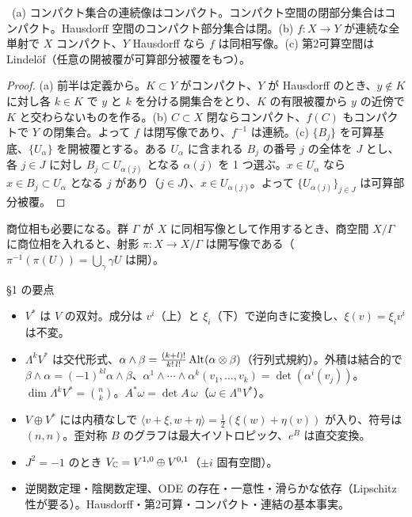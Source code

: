 \begin{prop}\label{A:prop:top}
\tP\ (a) コンパクト集合の連続像はコンパクト。コンパクト空間の閉部分集合はコンパクト。Hausdorff 空間のコンパクト部分集合は閉。(b) $f:X\to Y$ が連続な全単射で $X$ コンパクト、$Y$ Hausdorff なら $f$ は同相写像。(c) 第2可算空間は Lindelöf（任意の開被覆が可算部分被覆をもつ）。
\end{prop}
\begin{proof}
(a) 前半は定義から。$K\subset Y$ がコンパクト、$Y$ が Hausdorff のとき、$y\notin K$ に対し各 $k\in K$ で $y$ と $k$ を分ける開集合をとり、$K$ の有限被覆から $y$ の近傍で $K$ と交わらないものを作る。(b) $C\subset X$ 閉ならコンパクト、$f(C)$ もコンパクトで $Y$ の閉集合。よって $f$ は閉写像であり、$f^{-1}$ は連続。(c) $\{B_j\}$ を可算基底、$\{U_\alpha\}$ を開被覆とする。ある $U_\alpha$ に含まれる $B_j$ の番号 $j$ の全体を $J$ とし、各 $j\in J$ に対し $B_j\subset U_{\alpha(j)}$ となる $\alpha(j)$ を 1 つ選ぶ。$x\in U_\alpha$ なら $x\in B_j\subset U_\alpha$ となる $j$ があり（$j\in J$）、$x\in U_{\alpha(j)}$。よって $\{U_{\alpha(j)}\}_{j\in J}$ は可算部分被覆。
\end{proof}

商位相も必要になる。群 $\Gamma$ が $X$ に同相写像として作用するとき、商空間 $X/\Gamma$ に商位相を入れると、射影 $\pi:X\to X/\Gamma$ は開写像である（$\pi^{-1}(\pi(U))=\bigcup_{\gamma}\gamma U$ は開）。

\begin{keybox}{§1 の要点}
\begin{itemize}
\item $V^*$ は $V$ の双対。成分は $v^i$（上）と $\xi_i$（下）で逆向きに変換し、$\xi(v)=\xi_iv^i$ は不変。
\item $\Lambda^kV^*$ は交代形式、$\alpha\wedge\beta=\frac{(k+l)!}{k!\,l!}\operatorname{Alt}(\alpha\otimes\beta)$（行列式規約）。外積は結合的で \mbox{$\beta\wedge\alpha=(-1)^{kl}\alpha\wedge\beta$}、\allowbreak\mbox{$\alpha^1\wedge\cdots\wedge\alpha^k(v_1,\dots,v_k)=\det(\alpha^i(v_j))$}。\allowbreak\mbox{$\dim\Lambda^kV^*=\binom nk$}。\allowbreak\mbox{$A^*\omega=\det A\,\omega$}（$\omega\in\Lambda^nV^*$）。
\item $V\oplus V^*$ には内積なしで $\langle v+\xi,w+\eta\rangle=\frac12(\xi(w)+\eta(v))$ が入り、符号は $(n,n)$。歪対称 $B$ のグラフは最大イソトロピック、$e^B$ は直交変換。
\item $J^2=-1$ のとき $V_{\mathbb C}=V^{1,0}\oplus V^{0,1}$（$\pm i$ 固有空間）。
\item 逆関数定理・陰関数定理、ODE の存在・一意性・滑らかな依存（Lipschitz 性が要る）。Hausdorff・第2可算・コンパクト・連結の基本事実。
\end{itemize}
\end{keybox}

